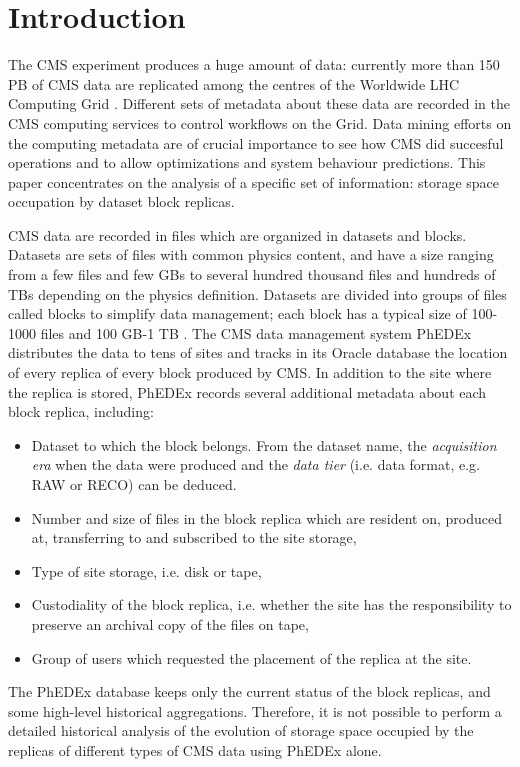 \documentclass[a4paper]{jpconf}
\begin{document}
\section{Introduction}
The CMS experiment \cite{CMS} produces a huge amount of data: currently more than 150 PB of CMS data are replicated among the centres of the Worldwide LHC Computing Grid \cite{WLCG}. Different sets of metadata about these data are recorded in the CMS computing services to control workflows on the Grid.
Data mining efforts on the computing metadata are of crucial importance to see how 
CMS did succesful operations and to allow optimizations and system behaviour predictions. This paper concentrates on the analysis of a specific set of information: storage space occupation by dataset block replicas.

CMS data are recorded in files which are organized in datasets and blocks. Datasets are sets of files with common physics content, and have a size ranging from a 
few files and few GBs to several hundred thousand files and hundreds of TBs depending on the physics definition. Datasets are divided into groups of files called blocks to simplify data management; each block has a typical size of 100-1000 files and 100 GB-1 TB \cite{DMWM}. The CMS data management system PhEDEx \cite{PhEDEx} distributes the data to tens of sites and tracks in its Oracle database the location of every replica of every block produced by CMS. In addition to the site where the replica is stored, PhEDEx records several additional metadata about each block replica, including:

\begin{itemize}
\item Dataset to which the block belongs. From the dataset name, the {\it acquisition era} when the data were produced and the {\it data tier} (i.e. data format, e.g. RAW or RECO) can be deduced.
\item Number and size of files in the block replica which are resident on, produced at, transferring to and subscribed to the site storage,
\item Type of site storage, i.e. disk or tape,
\item Custodiality of the block replica, i.e. whether the site has the responsibility to 
preserve an archival copy of the files on tape,
\item Group of users which requested the placement of the replica at the site.
\end{itemize}

The PhEDEx database keeps only the current status of the block replicas, and some high-level historical aggregations. Therefore, it is not possible to perform a detailed historical analysis of the evolution of storage space occupied by the replicas of different types of CMS data using PhEDEx alone.
\end{document}
